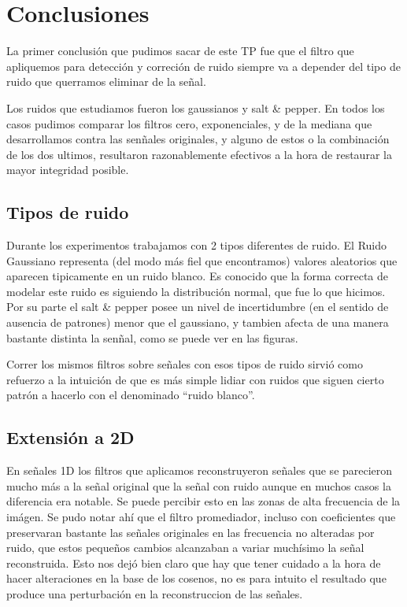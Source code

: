 \section{Conclusiones}

La primer conclusi\'on que pudimos sacar de este TP fue que el filtro que apliquemos para detecci\'on y correci\'on
de ruido siempre va a depender del tipo de ruido que querramos eliminar de la se\~nal.

Los ruidos que estudiamos fueron los gaussianos  y salt \& pepper. En todos los casos pudimos comparar los filtros
cero, exponenciales, y de la mediana que desarrollamos contra las sen\~nales originales, y alguno de estos o
la combinaci\'on de los dos ultimos, resultaron razonablemente efectivos a la hora de restaurar la mayor integridad posible.

\subsection{Tipos de ruido}

Durante los experimentos trabajamos con 2 tipos diferentes de ruido. 
El  Ruido Gaussiano representa (del modo m\'as fiel que encontramos) valores aleatorios  que aparecen tipicamente en
un ruido blanco. Es conocido que la forma correcta de modelar este ruido es siguiendo la distribuci\'on normal,
que fue lo que hicimos.
Por su parte el salt \& pepper posee un nivel de incertidumbre (en el sentido de ausencia de patrones)
menor que el gaussiano, y tambien afecta de una manera bastante distinta la sen\~nal, como se puede ver en las
figuras.

Correr los mismos filtros sobre se\~nales con esos tipos de ruido sirvi\'o como
refuerzo a la intuici\'on de que es m\'as simple lidiar con ruidos que siguen
cierto patr\'on a hacerlo con el denominado ``ruido blanco''.

\subsection{Extensi\'on a 2D}

En se\~nales 1D los filtros que aplicamos reconstruyeron se\~nales que se parecieron mucho m\'as a la se\~nal
original que la se\~nal con ruido aunque en muchos casos la diferencia era notable. Se puede percibir esto en las zonas
de alta frecuencia de la im\'agen. 
Se pudo notar ah\'i que el filtro promediador, incluso con coeficientes que preservaran
bastante las se\~nales originales en las frecuencia no alteradas por ruido, que estos peque\~nos cambios alcanzaban a
variar much\'isimo la se\~nal reconstruida. Esto nos dej\'o bien claro que hay que tener cuidado a la hora de hacer alteraciones
en la base de los cosenos, no es para intuito el resultado que produce una perturbaci\'on en la reconstruccion de las se\~nales.

